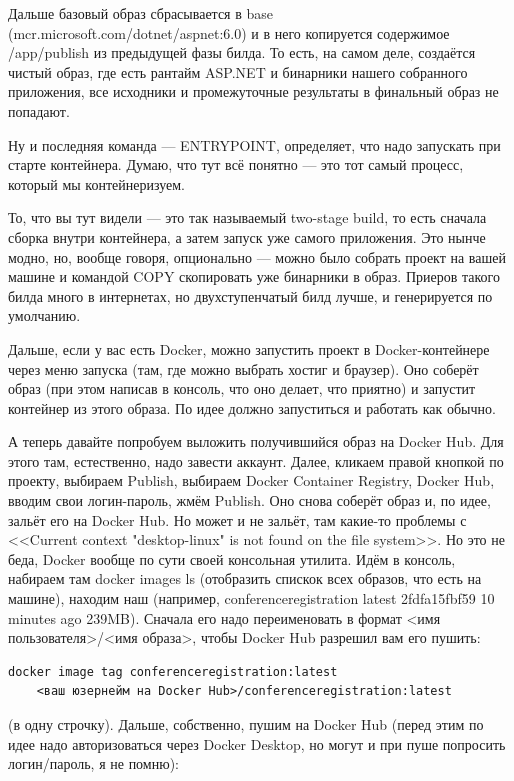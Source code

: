\documentclass[a5paper]{article}
\begin{document}
Дальше базовый образ сбрасывается в base (mcr.microsoft.com/dotnet/aspnet:6.0) и в него копируется содержимое /app/publish из предыдущей фазы билда. То есть, на самом деле, создаётся чистый образ, где есть рантайм ASP.NET и бинарники нашего собранного приложения, все исходники и промежуточные результаты в финальный образ не попадают.

Ну и последняя команда --- ENTRYPOINT, определяет, что надо запускать при старте контейнера. Думаю, что тут всё понятно --- это тот самый процесс, который мы контейнеризуем.

То, что вы тут видели --- это так называемый two-stage build, то есть сначала сборка внутри контейнера, а затем запуск уже самого приложения. Это нынче модно, но, вообще говоря, опционально --- можно было собрать проект на вашей машине и командой COPY скопировать уже бинарники в образ. Приеров такого билда много в интернетах, но двухступенчатый билд лучше, и генерируется по умолчанию.

Дальше, если у вас есть Docker, можно запустить проект в Docker-контейнере через меню запуска (там, где можно выбрать хостиг и браузер). Оно соберёт образ (при этом написав в консоль, что оно делает, что приятно) и запустит контейнер из этого образа. По идее должно запуститься и работать как обычно.

А теперь давайте попробуем выложить получившийся образ на Docker Hub. Для этого там, естественно, надо завести аккаунт. Далее, кликаем правой кнопкой по проекту, выбираем Publish, выбираем Docker Container Registry, Docker Hub, вводим свои логин-пароль, жмём Publish. Оно снова соберёт образ и, по идее, зальёт его на Docker Hub. Но может и не зальёт, там какие-то проблемы с <<Current context "desktop-linux" is not found on the file system>>. Но это не беда, Docker вообще по сути своей консольная утилита. Идём в консоль, набираем там docker images ls (отобразить спискок всех образов, что есть на машине), находим наш (например, conferenceregistration latest 2fdfa15fbf59 10 minutes ago 239MB). Сначала его надо переименовать в формат <имя пользователя>/<имя образа>, чтобы Docker Hub разрешил вам его пушить:

\begin{verbatim}
docker image tag conferenceregistration:latest 
    <ваш юзернейм на Docker Hub>/conferenceregistration:latest
\end{verbatim}

(в одну строчку). Дальше, собственно, пушим на Docker Hub (перед этим по идее надо авторизоваться через Docker Desktop, но могут и при пуше попросить логин/пароль, я не помню):
\end{document}
